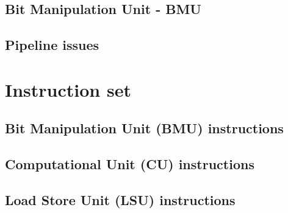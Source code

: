\documentclass[11pt]{book}
\begin{document}
\section{Bit Manipulation Unit - BMU}

\section{Pipeline issues}

\newpage
\chapter{Instruction set}
\newpage
\section{Bit Manipulation Unit (BMU) instructions}

\newpage
\section{Computational Unit (CU) instructions}

\newpage
\section{Load Store Unit (LSU) instructions}

\end{document}
